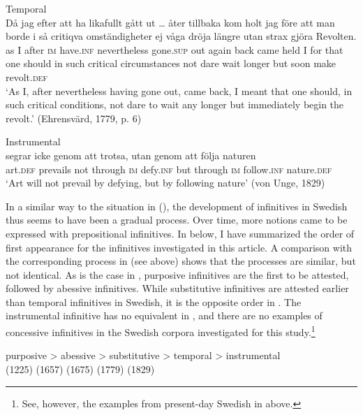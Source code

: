 \documentclass[output=paper]{langscibook}
\begin{document}
\ea
\label{ex:kalm:13}
\ea Temporal\label{ex:kalm:13a}\\
\gll Då jag efter att ha likafullt gått {ut …} åter tillbaka kom holt jag före att man borde i så critiqva omständigheter ej våga dröja längre utan strax gjöra Revolten.\\
as I after \textsc{im} have.\textsc{inf} nevertheless gone.\textsc{sup} out again back came held I for that one should in such critical circumstances not dare wait longer but soon make revolt.\textsc{def}\\
\glt ‘As I, after nevertheless having gone out, came back, I meant that one should, in such critical conditions, not dare to wait any longer but immediately begin the revolt.’ (Ehrensvärd, 1779, p. 6)

\ex Instrumental\label{ex:kalm:13b}\\
 segrar icke genom att trotsa, utan genom att följa naturen\\
art.\textsc{def} prevails not through \textsc{im} defy.\textsc{inf} but through \textsc{im} follow.\textsc{inf} nature.\textsc{def}\\
\glt ‘Art will not prevail by defying, but by following nature’ (von Unge, 1829)
\z 
\z 


In a similar way to the situation in  (\citealt{Schulte2007Prepositional,Schulte2007What}), the development of  infinitives in Swedish thus seems to have been a gradual process. Over time, more  notions came to be expressed with prepositional infinitives. In  below, I have summarized the order of first appearance for the  infinitives investigated in this article. A comparison with the corresponding process in  (see  above) shows that the processes are similar, but not identical. As is the case in , purposive infinitives are the first to be attested, followed by abessive infinitives. While substitutive infinitives are attested earlier than temporal infinitives in Swedish, it is the opposite order in . The instrumental infinitive has no equivalent in , and there are no examples of concessive infinitives in the Swedish corpora investigated for this study.\footnote{See, however, the examples from present-day Swedish in  above.}     

\ea  \label{ex:kalm:14}
\gll {}purposive >  abessive  > substitutive > temporal > instrumental\\
(1225) {} (1657) {} (1675) {} (1779) {} (1829)\\
\z 
\end{document}
